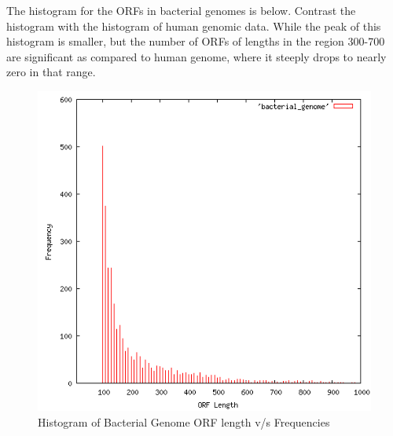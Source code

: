 \documentclass{article}
\begin{document}
\clearpage

The histogram for the ORFs in bacterial genomes is below. Contrast the histogram with the histogram of human genomic data. While the peak of this histogram is smaller, but the number of ORFs of lengths in the region 300-700 are significant as compared to human genome, where it steeply drops to nearly zero in that range.
\begin{figure}[htp]
\centering
\includegraphics[scale=0.4]{bacterial_genome.png}
\caption{Histogram of Bacterial Genome ORF length v/s Frequencies}\label{fig:fs}
\end{figure}
\end{document}
